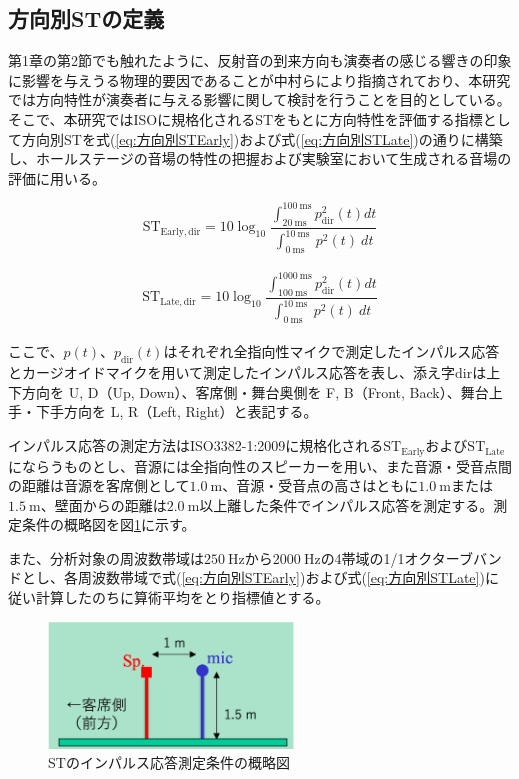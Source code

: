 \documentclass[11pt,a4j]{jreport}
\begin{document}
\subsection*{方向別STの定義}
第1章の第2節でも触れたように、反射音の到来方向も演奏者の感じる響きの印象に影響を与えうる物理的要因であることが中村ら\cite{中村1993}により指摘されており、本研究では方向特性が演奏者に与える影響に関して検討を行うことを目的としている。そこで、本研究ではISOに規格化されるSTをもとに方向特性を評価する指標として方向別STを式(\ref{eq:方向別STEarly})および式(\ref{eq:方向別STLate})の通りに構築し、ホールステージの音場の特性の把握および実験室において生成される音場の評価に用いる。

\begin{equation}
  \label{eq:方向別STEarly}
  \mathrm{ST_{Early,dir}}= 10 \log_{10}
  \frac{\int_{20 \: \mathrm{ms}}^{100 \: \mathrm{ms}} p_{\mathrm{dir}}^2(t) dt}
  {\int_{0 \: \mathrm{ms}}^{10 \: \mathrm{ms}} \: p^2(t) \: dt}
\end{equation}\\
\begin{equation}
  \label{eq:方向別STLate}
  \mathrm{ST_{Late,dir}}= 10 \log_{10}
  \frac{\int_{100 \: \mathrm{ms}}^{1000 \: \mathrm{ms}} p_{\mathrm{dir}}^2(t) dt}
  {\int_{0 \: \mathrm{ms}}^{10 \: \mathrm{ms}} \: p^2(t) \: dt}
\end{equation}\\

ここで、$p(t)$、$p_{\mathrm{dir}}(t)$はそれぞれ全指向性マイクで測定したインパルス応答とカージオイドマイクを用いて測定したインパルス応答を表し、添え字$\mathrm{dir}$は上下方向を U, D（Up, Down）、客席側・舞台奥側を F, B（Front, Back）、舞台上手・下手方向を L, R（Left, Right）と表記する。

インパルス応答の測定方法はISO3382-1:2009に規格化される$\mathrm{ST_{Early}}$および$\mathrm{ST_{Late}}$にならうものとし、音源には全指向性のスピーカーを用い、また音源・受音点間の距離は音源を客席側として$\SI{1.0}{\m}$、音源・受音点の高さはともに$\SI{1.0}{\m}$または$\SI{1.5}{\m}$、壁面からの距離は$\SI{2.0}{\m}$以上離した条件でインパルス応答を測定する。測定条件の概略図を図\ref{fig:STのIR測定条件}に示す。

また、分析対象の周波数帯域は$\SI{250}{\Hz}$から$\SI{2000}{\Hz}$の4帯域の1/1オクターブバンドとし、各周波数帯域で式(\ref{eq:方向別STEarly})および式(\ref{eq:方向別STLate})に従い計算したのちに算術平均をとり指標値とする。

\begin{figure}[H]
  \centering
  \includegraphics[width=6.5cm,clip]{images/howToMeasureST.png}
  \caption{STのインパルス応答測定条件の概略図}
  \label{fig:STのIR測定条件}
\end{figure}
\end{document}

